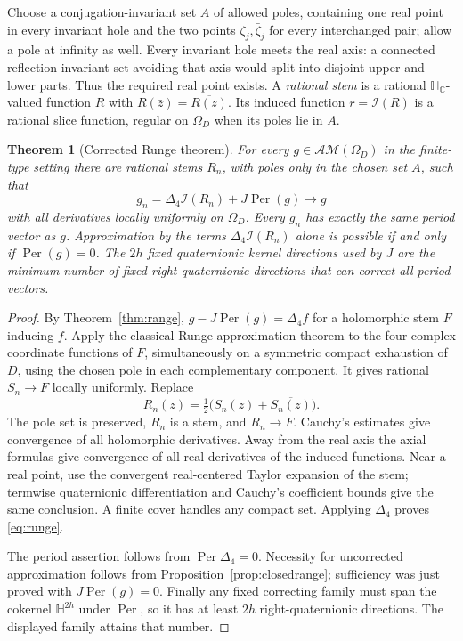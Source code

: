 \documentclass[11pt,a4paper]{article}
\numberwithin{equation}{section}
\newtheorem{theorem}{Theorem}[section]
\theoremstyle{definition}
\theoremstyle{remark}
\newcommand{\C}{\mathbb C}
\newcommand{\HH}{\mathbb H}
\newcommand{\HC}{\mathbb H_{\C}}
\newcommand{\AM}{\mathcal{AM}}
\newcommand{\lap}{\Delta_4}
\newcommand{\cI}{\mathcal I}
\newcommand{\Per}{\operatorname{Per}}
\begin{document}
Choose a conjugation-invariant set $A$ of allowed poles, containing one
real point in every invariant hole and the two points
$\zeta_j,\bar\zeta_j$ for every interchanged pair; allow a pole at
infinity as well. Every invariant hole meets the real axis: a connected
reflection-invariant set avoiding that axis would split into disjoint upper
and lower parts. Thus the required real point exists. A \emph{rational stem} is a rational $\HC$-valued
function $R$ with $R(\bar z)=\overline{R(z)}$. Its induced function
$r=\cI(R)$ is a rational slice function, regular on $\Omega_D$ when its
poles lie in $A$.

\begin{theorem}[Corrected Runge theorem]
\label{thm:runge}
For every $g\in\AM(\Omega_D)$ in the finite-type setting there are
rational stems $R_n$, with poles only in the chosen set $A$, such that
\begin{equation}
 g_n=\lap\cI(R_n)+J\Per(g)\longrightarrow g
 \label{eq:runge}
\end{equation}
with all derivatives locally uniformly on $\Omega_D$. Every $g_n$ has
exactly the same period vector as $g$. Approximation by the terms
$\lap\cI(R_n)$ alone is possible if and only if $\Per(g)=0$.
The $2h$ fixed quaternionic kernel directions used by $J$ are the minimum
number of fixed right-quaternionic directions that can correct all
period vectors.
\end{theorem}
\begin{proof}
By Theorem~\ref{thm:range}, $g-J\Per(g)=\lap f$ for a holomorphic stem
$F$ inducing $f$. Apply the classical Runge approximation theorem to the
four complex coordinate functions of $F$, simultaneously on a symmetric
compact exhaustion of $D$, using the chosen pole in each complementary
component. It gives rational $S_n\to F$ locally uniformly. Replace
\[
 R_n(z)=\tfrac12\big(S_n(z)+\overline{S_n(\bar z)}\big).
\]
The pole set is preserved, $R_n$ is a stem, and $R_n\to F$.
Cauchy's estimates give convergence of all holomorphic derivatives.
Away from the real axis the axial formulas give convergence of all
real derivatives of the induced functions. Near a real point, use the
convergent real-centered Taylor expansion of the stem; termwise
quaternionic differentiation and Cauchy's coefficient bounds give the
same conclusion. A finite cover handles any compact set. Applying
$\lap$ proves \eqref{eq:runge}.

The period assertion follows from $\Per\lap=0$. Necessity for uncorrected
approximation follows from Proposition~\ref{prop:closedrange}; sufficiency
was just proved with $J\Per(g)=0$. Finally any fixed correcting family
must span the cokernel $\HH^{2h}$ under $\Per$, so it has at least $2h$
right-quaternionic directions. The displayed family attains that number.
\end{proof}
\end{document}
